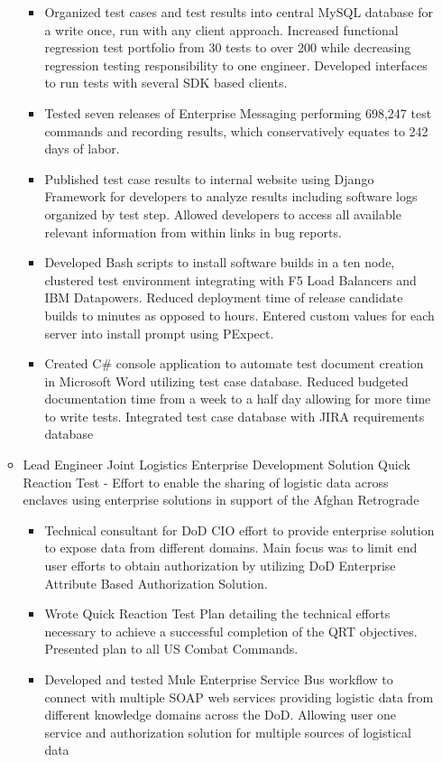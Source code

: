 \documentclass[letterpaper,10pt]{article}
\newcommand{\resitem}[1]{\item #1 \vspace{-2pt}}
\begin{document}
\begin{itemize}
\begin{itemize}
\begin{itemize}
		    \item{Organized test cases and test results into central MySQL database for a write once, run with any client approach.  Increased functional regression test portfolio from 30 tests to over 200 while decreasing regression testing responsibility to one engineer.  Developed interfaces to run tests with several SDK based clients.}
		    \item{Tested seven releases of Enterprise Messaging performing 698,247 test commands and recording results, which conservatively equates to 242 days of labor.}
		    \item{Published test case results to internal website using Django Framework for developers to analyze results including software logs organized by test step.  Allowed developers to access all available relevant information from within links in bug reports.}
		    \item{Developed Bash scripts to install software builds in a ten node, clustered test environment integrating with F5 Load Balancers and IBM Datapowers. Reduced deployment time of release candidate builds to minutes as opposed to hours.  Entered custom values for each server into install prompt using PExpect.}
		    \item{Created C\# console application to automate test document creation in Microsoft Word utilizing test case database. Reduced budgeted documentation time from a week to a half day allowing for more time to write tests.  Integrated test case database with JIRA requirements database}
		  \end{itemize}
		  \resitem{Lead Engineer Joint Logistics Enterprise Development Solution Quick Reaction Test - Effort to enable the sharing of logistic data across enclaves using enterprise solutions in support of the Afghan Retrograde}
		  		\begin{itemize}
		  			\item{Technical consultant for DoD CIO effort to provide enterprise solution to expose data from different domains.  Main focus was to limit end user efforts to obtain authorization by utilizing DoD Enterprise Attribute Based Authorization Solution.}
		  			\item{Wrote Quick Reaction Test Plan detailing the technical efforts necessary to achieve a successful completion of the QRT objectives.  Presented plan to all US Combat Commands.}
		  			\item{Developed and tested Mule Enterprise Service Bus workflow to connect with multiple SOAP web services providing logistic data from different knowledge domains across the DoD. Allowing user one service and authorization solution for multiple sources of logistical data }

\end{itemize}
\end{itemize}
\end{itemize}
\end{document}
